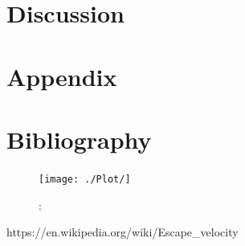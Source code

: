 \documentclass{article}
\begin{document}
\section{Discussion}


\section{Appendix}

\section{Bibliography}

\begin{figure}[H]
    \begin{center}
        \texttt{[image: ./Plot/]}
        \caption{: }
        \label{}
    \end{center}
\end{figure}

https://en.wikipedia.org/wiki/Escape_velocity
\end{document}
